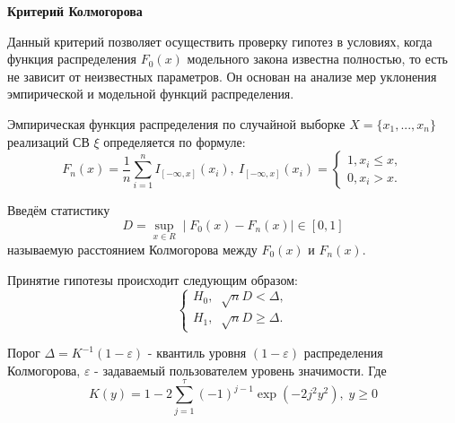 \documentclass[12pt]{article}
\begin{document}
\par \textbf{Критерий Колмогорова}
	\par Данный критерий позволяет осуществить проверку гипотез в условиях, когда функция распределения $ F_{0}(x) $ модельного закона известна полностью, то есть не зависит от неизвестных параметров. Он основан на анализе мер уклонения эмпирической и модельной функций распределения.
	\par Эмпирическая функция распределения по случайной выборке $ X = \lbrace x_{1},...,x_{n} \rbrace $ реализаций СВ $ \xi $ определяется по формуле:
$$
F_{n}(x) = \frac{1}{n} \sum\limits_{i=1}^{n} I_{[-\infty, x]} (x_{i}),\: I_{[-\infty, x]} (x_{i}) = 
	\begin{cases}
			1, x_{i} \leq x, \\
			0, x_{i} > x.
	\end{cases}
$$
	\par Введём статистику
$$
D = \sup_{x \in R} \mid F_{0}(x) - F_{n}(x) \mid \in [0, 1]
$$
называемую расстоянием Колмогорова между $ F_{0}(x) $ и $ F_{n}(x) $.
	\par Принятие гипотезы происходит следующим образом:
$$
	\begin{cases}
			H_{0},\; \sqrt[]{n} D < \Delta, \\
			H_{1},\; \sqrt[]{n} D \geq \Delta.
	\end{cases} 
$$
	\par Порог $ \Delta = K^{-1}(1 - \varepsilon) $ - квантиль уровня $ (1 - \varepsilon) $ распределения Колмогорова, $ \varepsilon $ - задаваемый пользователем уровень значимости. Где $$ K(y) = 1 - 2 \sum_{j=1}^{\tau} (-1)^{j - 1} \exp(-2 j^2 y^2),\; y\geq 0 $$	
	
\end{document}
